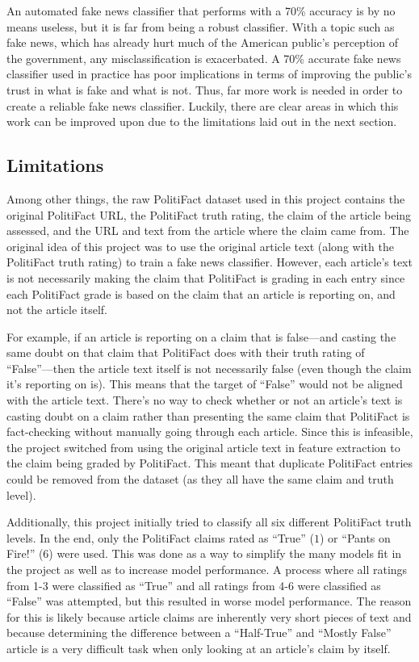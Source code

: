\documentclass[12pt]{article}
\begin{document}
An automated fake news classifier that performs with a 70\% accuracy is
by no means useless, but it is far from being a robust classifier. With
a topic such as fake news, which has already hurt much of the American
public's perception of the government, any misclassification is
exacerbated. A 70\% accurate fake news classifier used in practice has
poor implications in terms of improving the public's trust in what is
fake and what is not. Thus, far more work is needed in order to create a
reliable fake news classifier. Luckily, there are clear areas in which
this work can be improved upon due to the limitations laid out in the
next section.

\hypertarget{limitations}{%
\subsection{Limitations}\label{limitations}}

\label{sec:limitations}

Among other things, the raw PolitiFact dataset used in this project
contains the original PolitiFact URL, the PolitiFact truth rating, the
claim of the article being assessed, and the URL and text from the
article where the claim came from. The original idea of this project was
to use the original article text (along with the PolitiFact truth
rating) to train a fake news classifier. However, each article's text is
not necessarily making the claim that PolitiFact is grading in each
entry since each PolitiFact grade is based on the claim that an article
is reporting on, and not the article itself.

For example, if an article is reporting on a claim that is false---and
casting the same doubt on that claim that PolitiFact does with their
truth rating of ``False''---then the article text itself is not
necessarily false (even though the claim it's reporting on is). This
means that the target of ``False'' would not be aligned with the article
text. There's no way to check whether or not an article's text is
casting doubt on a claim rather than presenting the same claim that
PolitiFact is fact-checking without manually going through each article.
Since this is infeasible, the project switched from using the original
article text in feature extraction to the claim being graded by
PolitiFact. This meant that duplicate PolitiFact entries could be
removed from the dataset (as they all have the same claim and truth
level).

Additionally, this project initially tried to classify all six different
PolitiFact truth levels. In the end, only the PolitiFact claims rated as
``True'' (\(1\)) or ``Pants on Fire!'' (\(6\)) were used. This was done
as a way to simplify the many models fit in the project as well as to
increase model performance. A process where all ratings from 1-3 were
classified as ``True'' and all ratings from 4-6 were classified as
``False'' was attempted, but this resulted in worse model performance.
The reason for this is likely because article claims are inherently very
short pieces of text and because determining the difference between a
``Half-True'' and ``Mostly False'' article is a very difficult task when
only looking at an article's claim by itself.
\end{document}
